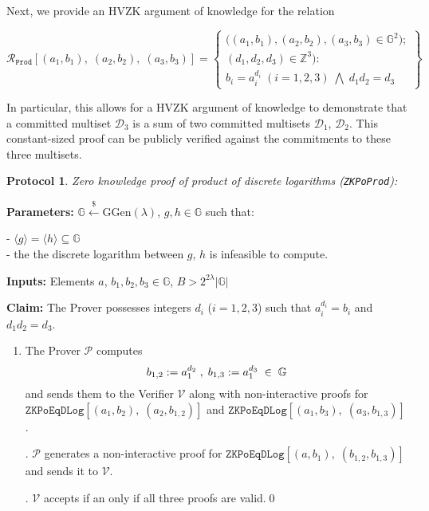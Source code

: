 \documentclass[11pt, lettersize, notitlepage, leqno, footskip=0.6cm]{article}
\newcommand{\ttt}{\texttt}
\newcommand{\bG}{\mathbb{G}}
\newcommand{\la}{\langle}
\newcommand{\ra}{\rangle}
\newcommand{\mc}{\mathcal}
\newcommand{\mb}{\mathbb}
\newcommand{\mr}{\mathrm}
\newcommand{\lam}{\lambda}
\newcommand{\lamb}{\lambda}
\newcommand{\sub}{\subseteq}
\newcommand{\mP}{\mc{P}}
\newcommand{\V}{\mc{V}}
\newcommand{\vs}{\vspace{-0.15cm}}
\newcommand{\noin}{\noindent}
\newtheorem{Prot}[Thm]{Protocol}
\numberwithin{equation}{section}
\begin{document}
\bigskip

\noin Next, we provide an HVZK argument of knowledge for the relation 

\[
  \mc{R}_{{\ttt{Prod}}}[(a_1, b_1),\;(a_2,b_2),\;(a_3,b_3)] = \left\{\begin{array}{l}
    \big((a_1, b_1), (a_2,b_2), (a_3,b_3)\in\mb{G}^2);\\
    (d_1, d_2, d_3)\in\mb{Z}^3): \\
    b_i = a_i^{d_i}\;(i=1,2,3)\; \bigwedge\; d_1d_2 = d_3
  \end{array}\right\}
\] 

In particular, this allows for a HVZK argument of knowledge to demonstrate that a committed multiset $\mc{D}_3$ is a sum of two committed multisets $\mc{D}_1$, $\mc{D}_2$. This constant-sized proof can be publicly verified against the commitments to these three multisets.

\vspace{0.1cm}

\begin{Prot} \normalfont \hypertarget{PoProd}{\textit{Zero knowledge proof of product of discrete logarithms}} (\verb|ZKPoProd|):\end{Prot} \vspace{-0.3cm}

\noin \textbf{Parameters:} $\mb{G}\xleftarrow{\$} \mr{GGen}(\lamb)$,  $g,h\in \mb{G}$ such that:

\noin - $\la g \ra = \la h \ra\sub \bG$ \\
\noin - the the discrete logarithm between $g$, $h$ is infeasible to compute.

\noin \textbf{Inputs:} Elements $a$, $b_1, b_2, b_3 \in \mb{G}$, $B > 2^{2\lam}|\bG|$

\noin \textbf{Claim:} The Prover possesses integers $d_i$ ($i=1,2,3$) such that $a_i^{d_i} = b_i$ and $d_1d_2 = d_3$.

\begin{enumerate}[wide, labelwidth=!, labelindent=0pt]\vs \item The Prover $\mP$ computes \vs $$b_{1,2}:= a_1^{d_2}\;,\; b_{1,3}:= a_1^{d_3}\;\in\;\bG \vs $$ and sends them to the Verifier $\V$ along with non-interactive proofs for $\ttt{ZKPoEqDLog}[(a_1,b_2),\;(a_2,b_{1,2})]$ and $\ttt{ZKPoEqDLog}[(a_1,b_3),\;(a_3,b_{1,3})]$.

\noin 2. $\mP$ generates a non-interactive proof for $\ttt{ZKPoEqDLog}[(a, b_1),\;(b_{1,2}, b_{1,3})]$ and sends it to $\V$.

\noin 3. $\V$ accepts if an only if all three proofs are valid.\qed\end{enumerate}
\end{document}
